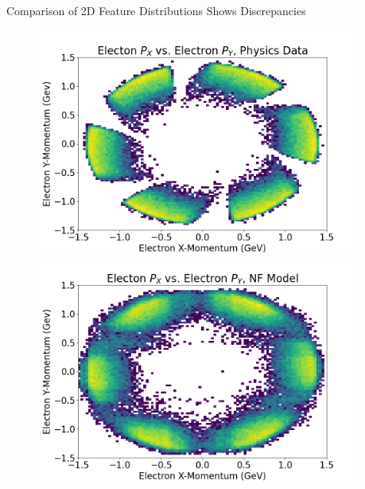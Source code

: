 \documentclass[aspectratio=169]{beamer}
\begin{document}
\begin{frame}{Comparison of 2D Feature Distributions Shows Discrepancies}
\begin{figure}[!ht]
\begin{minipage}{0.2573\textwidth}
    \end{minipage}
     \begin{minipage}{0.2573\textwidth}
            \centering
            \includegraphics[width=0.95\textwidth,trim={0 0 0 0},clip]{images/Hists2D/Electon_P_X_vs_Electron_P_Y,_Physics_Data.png}
            \includegraphics[width=0.95\textwidth,trim={0 0 0 0},clip]{images/Hists2D/Electon_P_X_vs_Electron_P_Y,_NF_Model.png}

    \end{minipage}
    \label{fig:2D}
\end{figure}
\end{frame}
\end{document}
